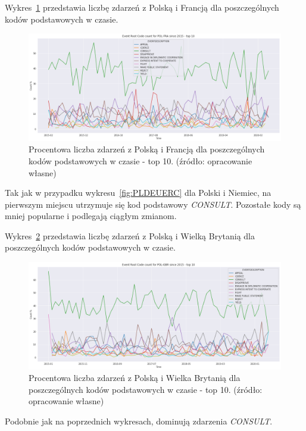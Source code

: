 \documentclass[11pt]{report}
\begin{document}
    Wykres~\ref{fig:PLFRAERC} przedstawia liczbę zdarzeń z Polską i Francją dla poszczególnych kodów podstawowych w czasie.
    \begin{figure}[!htp]
        \centering
        \includegraphics[width=\linewidth]{fig/PL/POLFRAERCperc.png}
        \caption{Procentowa liczba zdarzeń z Polską i Francją dla poszczególnych kodów podstawowych w czasie - top 10. (źródło: opracowanie własne)}
        \label{fig:PLFRAERC}
    \end{figure}
    Tak jak w przypadku wykresu~\ref{fig:PLDEUERC} dla Polski i Niemiec, na pierwszym miejscu utrzymuje się kod podstawowy \textit{CONSULT}.
    Pozostałe kody są mniej popularne i podlegają ciągłym zmianom.

    Wykres~\ref{fig:PLGBRERC} przedstawia liczbę zdarzeń z Polską i Wielką Brytanią dla poszczególnych kodów podstawowych w czasie.
    \begin{figure}[!htp]
        \centering
        \includegraphics[width=\linewidth]{fig/PL/POLGBRERCperc.png}
        \caption{Procentowa liczba zdarzeń z Polską i Wielka Brytanią dla poszczególnych kodów podstawowych w czasie - top 10. (źródło: opracowanie własne)}
        \label{fig:PLGBRERC}
    \end{figure}
    Podobnie jak na poprzednich wykresach, dominują zdarzenia \textit{CONSULT}.
\end{document}
